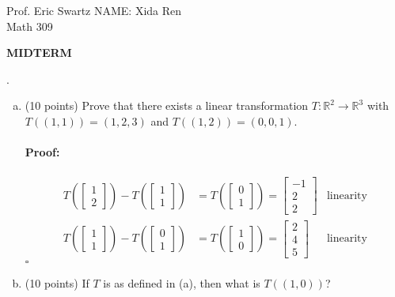 \documentclass[12pt]{article}
\newcommand{\R}{\mathbb{R}}
\newenvironment{proof}{\paragraph{Proof:}}{\hfill$\square$}
\begin{document}
    
    
    \noindent Prof. Eric Swartz \hspace{3.5in} NAME: Xida Ren\\
    Math 309\\
    
    
    \begin{center}
    \textbf{{\Large  MIDTERM}}
    \end{center}
    
    
    .
    \begin{enumerate}[(a)]
    \item (10 points) Prove that there exists a linear transformation $T: \R^2 \rightarrow \R^3$ with $T((1,1)) = (1,2,3)$ and $T((1,2)) = (0,0,1)$.
    
    \begin{proof}
        \begin{align*}
            T(\begin{bmatrix}
                1\\2
            \end{bmatrix})
            -
            T(\begin{bmatrix}
                1\\1
            \end{bmatrix})
            & =
            T(\begin{bmatrix}
                0\\1
            \end{bmatrix})
            =
            \begin{bmatrix}
                -1\\2\\2
            \end{bmatrix}
            &\text{linearity}\\
            T(\begin{bmatrix}
                1\\1
            \end{bmatrix})
            -
            T(\begin{bmatrix}
                0\\1
            \end{bmatrix})
            & =
            T(\begin{bmatrix}
                1\\0
            \end{bmatrix})
            =
            \begin{bmatrix}
                2\\4\\5
            \end{bmatrix}
            &\text{linearity}
        \end{align*}
    \end{proof}
    \item (10 points) If $T$ is as defined in (a), then what is $T((1,0))$?
    

\end{enumerate}
\end{document}
